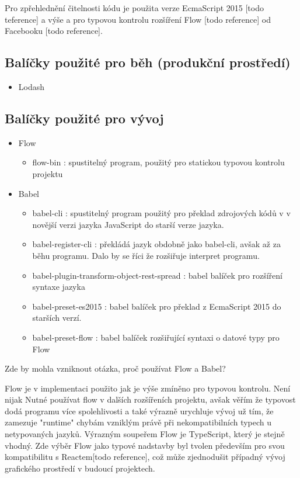 Pro zpřehlednění čitelnosti kódu je použita verze EcmaScript 2015 [todo teference] a výše a pro typovou kontrolu rozšíření Flow [todo reference] od Facebooku [todo reference]. 

\subsection{Balíčky použité pro běh (produkční prostředí)}
\begin{itemize}
    \item Lodash \cite{lodash}
\end{itemize}

\subsection{Balíčky použité pro vývoj}
\begin{itemize}
    \item  Flow \cite{Flow}
        \begin{itemize}
            \item flow-bin \cite{flow-bin}: spustitelný program, použitý pro statickou typovou kontrolu projektu
        \end{itemize}
    \item Babel \cite{Babel}
        \begin{itemize}
            \item babel-cli \cite{babel-cli}: spustitelný program použitý pro  překlad zdrojových kódů v v novější verzi jazyka JavaScript do starší verze jazyka.
            \item babel-register-cli \cite{babel-register-cli}: překládá jazyk obdobně jako babel-cli, avšak až za běhu programu. Dalo by se říci že rozšiřuje interpret programu. 
            \item babel-plugin-transform-object-rest-spread \cite{babel-plugin-transform-object-rest-spread}: babel balíček pro rozšíření syntaxe jazyka
            \item babel-preset-es2015 \cite{babel-preset-es2015}: babel balíček pro překlad z EcmaScript 2015 do starších verzí.
            \item babel-preset-flow \cite{babel-preset-flow}: babel balíček rozšiřující syntaxi o datové typy pro Flow
        \end{itemize}
\end{itemize}

Zde by mohla vzniknout otázka, proč používat Flow a Babel?

Flow je v implementaci použito jak je výše zmíněno pro typovou kontrolu. Není nijak Nutné používat flow v dalších rozšířeních projektu, avšak věřím že typovost dodá programu více spolehlivosti a také výrazně urychluje vývoj už tím, že zamezuje "runtime" chybám vzniklým právě při nekompatibilních typech u netypovaných jazyků. Výrazným soupeřem Flow je TypeScript, který je stejně vhodný. Zde výběr Flow jako typové nadstavby byl tvolen především pro svou kompatibilitu s Reactem[todo reference], což může zjednodušit případný vývoj grafického prostředí v budoucí projektech.

